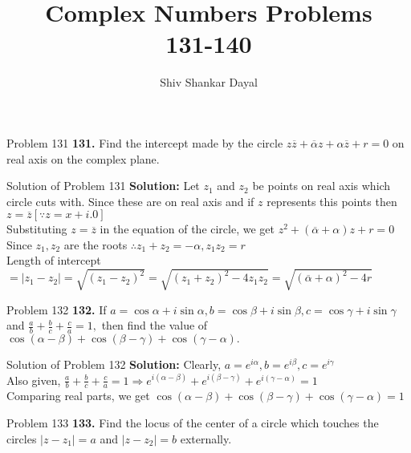 \documentclass[aspectratio=169,8pt]{beamer}
\title{Complex Numbers Problems\\ 131-140}
\author[Shiv Shankar Dayal]{Shiv Shankar Dayal}
\begin{document}
\begin{frame}
  \titlepage
\end{frame}
\begin{frame}{Problem 131}
  \textbf{131.} Find the intercept made by the circle $z\overline{z} + \overline{\alpha}z + \alpha\overline{z} + r = 0$ on real
  axis on the complex plane.
\end{frame}
\begin{frame}{Solution of Problem 131}
  \textbf{Solution:} Let $z_1$ and $z_2$ be points on real axis which circle cuts with. Since these are on real axis and if $z$
  represents this points then $z = \overline{z}[\because z = x + i.0]$\\
  \vspace*{0.2cm}
  Substituting $z = \overline{z}$ in the equation of the circle, we get $z^2 + (\overline{\alpha} + \alpha)z + r = 0$\\
  \vspace*{0.2cm}
  Since $z_1, z_2$ are the roots $\therefore z_1 + z_2 = -\alpha, z_1z_2 = r$\\
  \vspace*{0.2cm}
  Length of intercept $=|z_1 - z_2| = \sqrt{(z_1 - z_2)^2} = \sqrt{(z_1 + z_2)^2 - 4z_1z_2} = \sqrt{(\overline{\alpha} + \alpha)^2
    - 4r}$
\end{frame}
\begin{frame}{Problem 132}
  \textbf{132.} If $a = \cos\alpha +i\sin\alpha, b = \cos\beta + i\sin\beta, c = \cos\gamma + i\sin\gamma$ and $\frac{a}{b} +
  \frac{b}{c} + \frac{c}{a} = 1,$ then find the value of $\cos(\alpha - \beta) + \cos(\beta - \gamma) + \cos(\gamma - \alpha).$
\end{frame}
\begin{frame}{Solution of Problem 132}
  \textbf{Solution:} Clearly, $a = e^{i\alpha}, b = e^{i\beta}, c= e^{i\gamma}$\\
  \vspace*{0.2cm}
  Also given, $\frac{a}{b} + \frac{b}{c} + \frac{c}{a} = 1\Rightarrow e^{i(\alpha - \beta)} + e^{i(\beta - \gamma)} + e^{i(\gamma -
    \alpha)} = 1$\\
  \vspace*{0.2cm}
  Comparing real parts, we get $\cos(\alpha - \beta) + \cos(\beta - \gamma) + \cos(\gamma - \alpha) = 1$
\end{frame}
\begin{frame}{Problem 133}
  \textbf{133.} Find the locus of the center of a circle which touches the circles $|z - z_1| = a$ and $|z - z_2| = b$ externally.
\end{frame}
\end{document}
